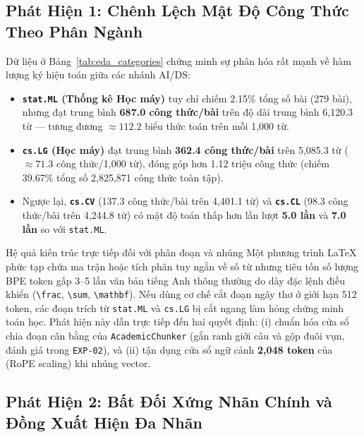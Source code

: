 \subsection{Phát Hiện 1: Chênh Lệch Mật Độ Công Thức Theo Phân Ngành}
\label{sec:ch3_insight1}

Dữ liệu ở Bảng~\ref{tab:eda_categories} chứng minh sự phân hóa rất mạnh về hàm lượng ký hiệu toán giữa các nhánh AI/DS:
\begin{itemize}
  \item \textbf{\texttt{stat.ML} (Thống kê Học máy)} tuy chỉ chiếm 2.15\% tổng số bài (279 bài), nhưng đạt trung bình \textbf{687.0 công thức/bài} trên độ dài trung bình 6,120.3 từ --- tương đương $\approx 112.2$ biểu thức toán trên mỗi 1,000 từ.
  \item \textbf{\texttt{cs.LG} (Học máy)} đạt trung bình \textbf{362.4 công thức/bài} trên 5,085.3 từ ($\approx 71.3$ công thức/1,000 từ), đóng góp hơn 1.12 triệu công thức (chiếm 39.67\% tổng số 2,825,871 công thức toàn tập).
  \item Ngược lại, \textbf{\texttt{cs.CV}} (137.3 công thức/bài trên 4,401.1 từ) và \textbf{\texttt{cs.CL}} (98.3 công thức/bài trên 4,244.8 từ) có mật độ toán thấp hơn lần lượt \textbf{5.0 lần} và \textbf{7.0 lần} so với \texttt{stat.ML}.
\end{itemize}

\begin{calloutbox}{Hệ quả kiến trúc trực tiếp đối với phân đoạn và nhúng}
Một phương trình LaTeX phức tạp chứa ma trận hoặc tích phân tuy ngắn về số từ nhưng tiêu tốn số lượng BPE token gấp 3--5 lần văn bản tiếng Anh thông thường do dày đặc lệnh điều khiển (\texttt{\textbackslash frac}, \texttt{\textbackslash sum}, \texttt{\textbackslash mathbf}). Nếu dùng cơ chế cắt đoạn ngây thơ ở giới hạn 512 token, các đoạn trích từ \texttt{stat.ML} và \texttt{cs.LG} bị cắt ngang làm hỏng chứng minh toán học. Phát hiện này dẫn trực tiếp đến hai quyết định: (i) chuẩn hóa cửa sổ chia đoạn cân bằng của \texttt{AcademicChunker} (gắn ranh giới câu và gộp đuôi vụn, đánh giá trong \texttt{EXP-02}), và (ii) tận dụng cửa sổ ngữ cảnh \textbf{2,048 token} của  (RoPE scaling) khi nhúng vector.
\end{calloutbox}

\subsection{Phát Hiện 2: Bất Đối Xứng Nhãn Chính và Đồng Xuất Hiện Đa Nhãn}
\label{sec:ch3_insight2}

